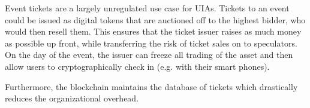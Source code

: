 Event tickets are a largely unregulated use case for UIAs. Tickets to an event
could be issued as digital tokens that are auctioned off to the highest bidder,
who would then resell them. This ensures that the ticket issuer raises as much
money as possible up front, while transferring the risk of ticket sales on to
speculators. On the day of the event, the issuer can freeze all trading of the
asset and then allow users to cryptographically check in (e.g. with their smart
phones).

Furthermore, the blockchain maintains the database of tickets which drastically
reduces the organizational overhead.
